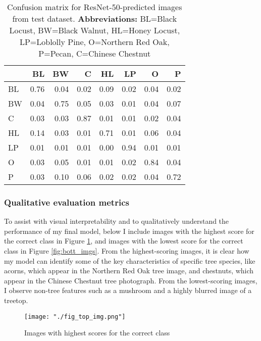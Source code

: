 \documentclass[10pt,twocolumn,letterpaper]{article}
\begin{document}
\begin{table}[!htbp]
  \begin{center}
    \small
    \begin{tabular}{lrrrrrrr}
      \toprule
      {} &    BL &    BW &     C &    HL &    LP &     O &     P \\
      \midrule
      BL &  0.76 &  0.04 &  0.02 &  0.09 &  0.02 &  0.04 &  0.02 \\
      BW &  0.04 &  0.75 &  0.05 &  0.03 &  0.01 &  0.04 &  0.07 \\
      C  &  0.03 &  0.03 &  0.87 &  0.01 &  0.01 &  0.02 &  0.04 \\
      HL &  0.14 &  0.03 &  0.01 &  0.71 &  0.01 &  0.06 &  0.04 \\
      LP &  0.01 &  0.01 &  0.01 &  0.00 &  0.94 &  0.01 &  0.01 \\
      O  &  0.03 &  0.05 &  0.01 &  0.01 &  0.02 &  0.84 &  0.04 \\
      P  &  0.03 &  0.10 &  0.06 &  0.02 &  0.02 &  0.04 &  0.72 \\
      \bottomrule
      \end{tabular}
  \end{center}
  \caption{\label{tab:confusion} Confusion matrix for ResNet-50-predicted images from test dataset. \textbf{Abbreviations:} BL=Black Locust, BW=Black Walnut, HL=Honey Locust, LP=Loblolly Pine, O=Northern Red Oak, P=Pecan, C=Chinese Chestnut}
  \end{table}

\subsubsection{Qualitative evaluation metrics}
To assist with visual interpretability and to qualitatively understand the performance of my final model, below I include images with the highest score for the correct class in Figure \ref{fig:top_imgs}, and images with the lowest score for the correct class in Figure \ref{fig:bott_imgs}. From the highest-scoring images, it is clear how my model can identify some of the key characteristics of specific tree species, like acorns, which appear in the Northern Red Oak tree image, and chestnuts, which appear in the Chinese Chestnut tree photograph. From the lowest-scoring images, I observe non-tree features such as a mushroom and a highly blurred image of a treetop.

\begin{figure}[!htbp]
  \centering
  \texttt{[image: "./fig\_top\_img.png"]}
  \caption{\label{fig:top_imgs} Images with highest scores for the correct class}
\end{figure}
\end{document}

